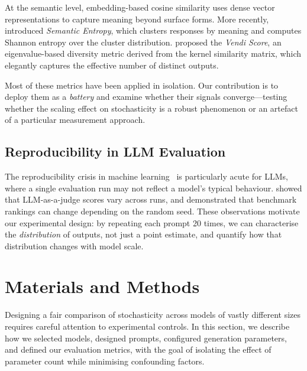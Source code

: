 \documentclass[11pt,a4paper]{article}
\begin{document}
At the semantic level, embedding-based cosine similarity uses dense vector representations to capture meaning beyond surface forms.
More recently, \citet{kuhn2023semantic} introduced \emph{Semantic Entropy}, which clusters responses by meaning and computes Shannon entropy over the cluster distribution.
\citet{friedman2023vendi} proposed the \emph{Vendi Score}, an eigenvalue-based diversity metric derived from the kernel similarity matrix, which elegantly captures the effective number of distinct outputs.

Most of these metrics have been applied in isolation.
Our contribution is to deploy them as a \emph{battery} and examine whether their signals converge---testing whether the scaling effect on stochasticity is a robust phenomenon or an artefact of a particular measurement approach.

\subsection{Reproducibility in LLM Evaluation}

The reproducibility crisis in machine learning~\citep{pineau2021improving} is particularly acute for LLMs, where a single evaluation run may not reflect a model's typical behaviour.
\citet{zheng2023judging} showed that LLM-as-a-judge scores vary across runs, and \citet{biderman2023pythia} demonstrated that benchmark rankings can change depending on the random seed.
These observations motivate our experimental design: by repeating each prompt 20 times, we can characterise the \emph{distribution} of outputs, not just a point estimate, and quantify how that distribution changes with model scale.

\section{Materials and Methods}
\label{sec:methods}

Designing a fair comparison of stochasticity across models of vastly different sizes requires careful attention to experimental controls.
In this section, we describe how we selected models, designed prompts, configured generation parameters, and defined our evaluation metrics, with the goal of isolating the effect of parameter count while minimising confounding factors.
\end{document}
